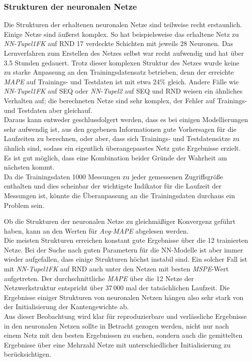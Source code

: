 \documentclass[
	12pt,
	a4paper,
	BCOR10mm,
	DIV14,
	listof=totoc,
	bibliography=totoc,
	headsepline
]{scrreprt}
\begin{document}
\subsubsection{Strukturen der neuronalen Netze}
Die Strukturen der erhaltenen neuronalen Netze sind teilweise recht erstaunlich.
Einige Netze sind äußerst komplex.
So hat beispielsweise das erhaltene Netz zu \textit{NN-Tupel1FK} auf RND 17 verdeckte Schichten mit jeweils 28 Neuronen.
Das Lernverfahren zum Erstellen des Netzes selbst war recht aufwendig und hat über 3.5 Stunden gedauert.
Trotz dieser komplexen Struktur des Netzes wurde keine zu starke Anpassung an den Trainingsdatensatz betrieben, denn der erreichte \textit{MAPE} auf Trainings- und Testdaten ist mit etwa 24\% gleich. Andere Fälle wie \textit{NN-Tupel1FK} auf SEQ oder \textit{NN-Tupel2} auf SEQ und RND weisen ein ähnliches Verhalten auf; die berechneten Netze sind sehr komplex, der Fehler auf Trainings- und Testdaten aber gleichauf.\\
Daraus kann entweder geschlussfolgert werden, dass es bei einigen Modellierungen sehr aufwendig ist, aus den gegebenen Informationen gute Vorhersagen für die Laufzeiten zu berechnen, oder aber, dass sich Trainings- und Testdatensätze zu ähnlich sind, sodass ein eigentlich überangepasstes Netz gute Ergebnisse erzielt.
Es ist gut möglich, dass eine Kombination beider Gründe der Wahrheit am nächsten kommt.\\
Da die Trainingsdaten 1000 Messungen zu jeder gemessenen Zugriffsgröße enthalten und dies scheinbar der wichtigste Indikator für die Laufzeit der Messungen ist, könnte die Überanpassung an die Trainingsdaten durchaus ein Problem sein.\medskip

Ob die Strukturen der neuronalen Netze zu gleichmäßiger Konvergenz geführt haben, kann an den Werten für \textit{Avg-MAPE} abgelesen werden.\\
Die meisten Strukturen erreichen konstant gute Ergebnisse über die 12 trainierten Netze.
Bei der Suche nach guten Parametern für die NN-Modelle ist aber immer wieder aufgefallen, dass einige Strukturen höchst instabil sind.
Ein solcher Fall ist mit \textit{NN-Tupel1FK} auf RND auch unter den Netzen mit besten \textit{MSPE}-Wert aufgetreten.
Der durchschnittliche \textit{MAPE} über die 12 Netze der Netzwerkstruktur entspricht über 37\,000 mal der tatsächlichen Laufzeit.
Die Ergebnisse einiger Strukturen von neuronalen Netzen hängen also sehr stark von der Initialisierung der Kantengewichte ab.\\
Aus dieser Beobachtung wird klar für reproduzierbare und verlässliche Ergebnisse in den neuronalen Netzen sollte in Betracht gezogen werden, nicht nur nach einem Netz mit den besten Ergebnissen zu suchen, sondern auch die gemittelten Ergebnisse über eine Mehrzahl Netze mit unterschiedlicher Initialisierung zu berücksichtigen.
\end{document}
